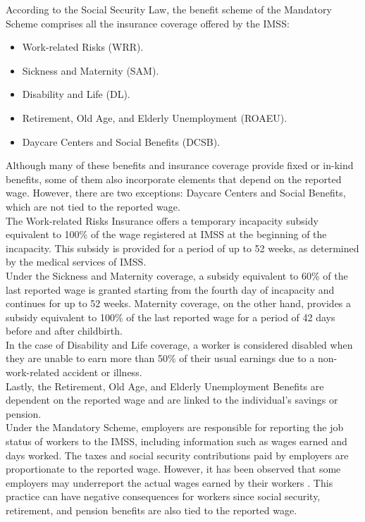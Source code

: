 \documentclass[10pt, oneside]{book}
\begin{document}
According to the Social Security Law, the benefit scheme of the Mandatory Scheme comprises all the insurance coverage offered by the IMSS:

\begin{itemize}
    \item Work-related Risks (WRR).
    \item Sickness and Maternity (SAM).
    \item Disability and Life (DL).
    \item Retirement, Old Age, and Elderly Unemployment (ROAEU).
    \item Daycare Centers and Social Benefits (DCSB). 
\end{itemize}

Although many of these benefits and insurance coverage provide fixed or in-kind benefits, some of them also incorporate elements that depend on the reported wage. However, there are two exceptions: Daycare Centers and Social Benefits, which are not tied to the reported wage. \\

The Work-related Risks Insurance offers a temporary incapacity subsidy equivalent to 100\% of the wage registered at IMSS at the beginning of the incapacity. This subsidy is provided for a period of up to 52 weeks, as determined by the medical services of IMSS. \\

Under the Sickness and Maternity coverage, a subsidy equivalent to 60\% of the last reported wage is granted starting from the fourth day of incapacity and continues for up to 52 weeks. Maternity coverage, on the other hand, provides a subsidy equivalent to 100\% of the last reported wage for a period of 42 days before and after childbirth. \\

In the case of Disability and Life coverage, a worker is considered disabled when they are unable to earn more than 50\% of their usual earnings due to a non-work-related accident or illness. \\

Lastly, the Retirement, Old Age, and Elderly Unemployment Benefits are dependent on the reported wage and are linked to the individual's savings or pension. \\

Under the Mandatory Scheme, employers are responsible for reporting the job status of workers to the IMSS, including information such as wages earned and days worked. The taxes and social security contributions paid by employers are proportionate to the reported wage. However, it has been observed that some employers may underreport the actual wages earned by their workers \citep{kumler2020enlisting}. This practice can have negative consequences for workers since social security, retirement, and pension benefits are also tied to the reported wage. \\
\end{document}
